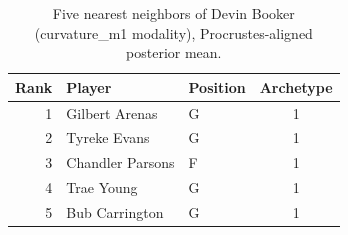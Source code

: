 \begin{table}[htbp]
  \centering\small
  \begin{tabular}{rllc}
    \toprule
    Rank & Player & Position & Archetype \\
    \midrule
    1 & Gilbert Arenas & G & 1 \\
    2 & Tyreke Evans & G & 1 \\
    3 & Chandler Parsons & F & 1 \\
    4 & Trae Young & G & 1 \\
    5 & Bub Carrington & G & 1 \\
    \bottomrule
  \end{tabular}
  \caption{Five nearest neighbors of Devin Booker (curvature_m1 modality), Procrustes-aligned posterior mean.}
  \label{tab:Devin_Booker_neighbors_curvature_m1}
\end{table}

